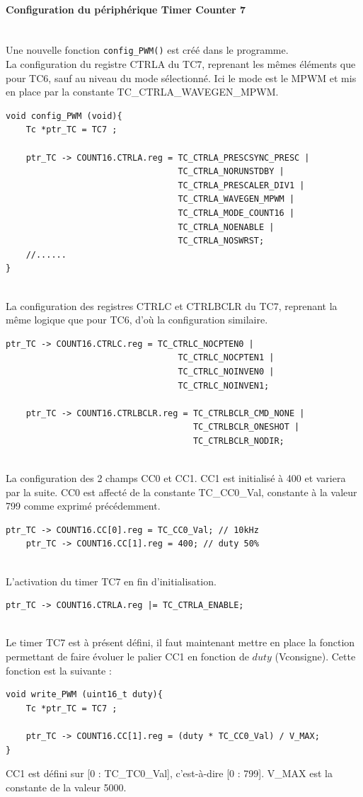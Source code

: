\documentclass[a4paper]{article}
\begin{document}
    \paragraph{Configuration du périphérique Timer Counter 7} ~~\\
	Une nouvelle fonction \texttt{config\_PWM()} est créé dans le programme. \\
	La configuration du registre CTRLA du TC7, reprenant les mêmes éléments que pour TC6, sauf au niveau du mode sélectionné. Ici le mode est le MPWM et mis en place par la constante TC\_CTRLA\_WAVEGEN\_MPWM. 
\begin{lstlisting}[style=CStyle]
void config_PWM (void){
	Tc *ptr_TC = TC7 ;
	
	ptr_TC -> COUNT16.CTRLA.reg = TC_CTRLA_PRESCSYNC_PRESC |
	                              TC_CTRLA_NORUNSTDBY |
	                              TC_CTRLA_PRESCALER_DIV1 |
	                              TC_CTRLA_WAVEGEN_MPWM |
	                              TC_CTRLA_MODE_COUNT16 |
	                              TC_CTRLA_NOENABLE |
	                              TC_CTRLA_NOSWRST;
	//......
}
\end{lstlisting}~~\\
	La configuration des registres CTRLC et CTRLBCLR du TC7, reprenant la même logique que pour TC6, d’où la configuration similaire.
\begin{lstlisting}[style=CStyle]
    ptr_TC -> COUNT16.CTRLC.reg = TC_CTRLC_NOCPTEN0 |
                                  TC_CTRLC_NOCPTEN1 |
                                  TC_CTRLC_NOINVEN0 |
                                  TC_CTRLC_NOINVEN1;
	
    ptr_TC -> COUNT16.CTRLBCLR.reg = TC_CTRLBCLR_CMD_NONE |
                                     TC_CTRLBCLR_ONESHOT |
                                     TC_CTRLBCLR_NODIR;
\end{lstlisting}~~\\
	La configuration des 2 champs CC0 et CC1. CC1 est initialisé à 400 et variera par la suite. CC0 est affecté de la constante TC\_CC0\_Val, constante à la valeur 799 comme exprimé précédemment. 
\begin{lstlisting}[style=CStyle]
    ptr_TC -> COUNT16.CC[0].reg = TC_CC0_Val; // 10kHz
    ptr_TC -> COUNT16.CC[1].reg = 400; // duty 50%
\end{lstlisting}~~\\
    L’activation du timer TC7 en fin d’initialisation.
\begin{lstlisting}[style=CStyle]
    ptr_TC -> COUNT16.CTRLA.reg |= TC_CTRLA_ENABLE;
\end{lstlisting}~~\\
    Le timer TC7  est à présent  défini, il faut  maintenant  mettre  en place la  fonction permettant de faire évoluer le palier CC1 en fonction de $duty$ (Vconsigne). Cette fonction est la suivante :  
\begin{lstlisting}[style=CStyle]
void write_PWM (uint16_t duty){
	Tc *ptr_TC = TC7 ;
	
	ptr_TC -> COUNT16.CC[1].reg = (duty * TC_CC0_Val) / V_MAX;
}
\end{lstlisting}
    CC1 est défini sur [0 : TC\_TC0\_Val], c’est-à-dire [0 : 799]. V\_MAX est la constante de la valeur 5000.
\end{document}
